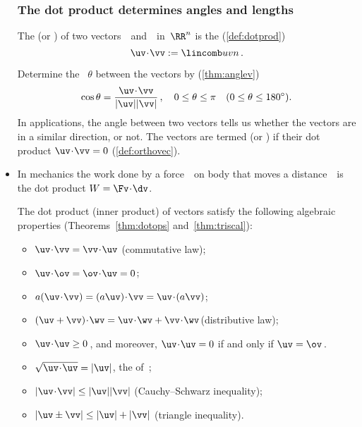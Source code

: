 \begin{itemize}
\subsubsection{The dot product determines angles and lengths}

\itemhi The  (or ) of two vectors~\uv\ and~\vv\ in~\(\RR^n\) is the  (\autoref{def:dotprod})
\begin{equation*}
\uv\cdot \vv:= \lincomb uvn\,.
\end{equation*}
\begin{itemize}
\itemhi  Determine the ~\(\theta\) between the vectors by (\autoref{thm:anglev})
\begin{equation*}
\cos\theta=\frac{\uv\cdot\vv}{|\uv||\vv|}\,,
\quad 0\leq\theta\leq\pi
\quad (0\leq\theta\leq180^\circ).
\end{equation*}
In applications, the angle between two vectors tells us whether the vectors are in a similar direction, or not.
\itemhi The vectors are termed  (or ) if their dot product \(\uv\cdot\vv=0\) (\autoref{def:orthovec}).
\end{itemize}

\item In mechanics the work done by a force~\Fv\ on body that moves a distance~\dv\ is the dot product \(W=\Fv\cdot\dv\).

\itemme The dot product (inner product) of vectors satisfy the following algebraic properties (Theorems~\ref{thm:dotops} and~\ref{thm:triscal}):
\begin{itemize}
\item \(\uv\cdot\vv=\vv\cdot\uv\) \quad({commutative law});
\item \(\uv\cdot\ov=\ov\cdot\uv=0\);
\item \(a(\uv\cdot\vv)=(a\uv)\cdot\vv=\uv\cdot(a\vv)\);
\item \((\uv+\vv)\cdot\wv=\uv\cdot\wv+\vv\cdot\wv\)\quad({distributive law});
\item \(\uv\cdot\uv\geq0\)\,, and moreover, \(\uv\cdot\uv=0\) if and only if \(\uv=\ov\)\,.
\item \(\sqrt{\uv\cdot\uv}=|\uv|\), the  of~\uv;
\item \(|\uv\cdot\vv|\leq|\uv||\vv|\) ({Cauchy--Schwarz inequality});
\item \(|\uv\pm\vv|\leq|\uv|+|\vv|\) ({triangle inequality}).
\end{itemize}


\end{itemize}
